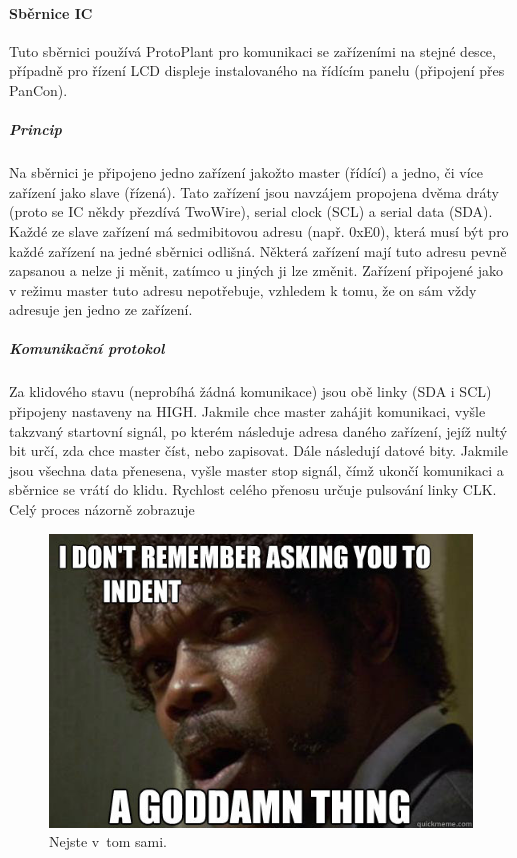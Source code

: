 \paragraph{Sběrnice IC}
Tuto sběrnici používá ProtoPlant pro komunikaci se zařízeními na stejné desce, případně pro řízení LCD displeje instalovaného na řídícím panelu (připojení přes PanCon). 

\subparagraph{Princip}
Na sběrnici je připojeno jedno zařízení jakožto master (řídící) a jedno, či více zařízení jako slave (řízená).
Tato zařízení jsou navzájem propojena dvěma dráty (proto se IC někdy přezdívá TwoWire), serial clock (SCL) a serial data (SDA).
Každé ze slave zařízení má sedmibitovou adresu (např. 0xE0), která musí být pro každé zařízení na jedné sběrnici odlišná.
Některá zařízení mají tuto adresu pevně zapsanou a nelze ji měnit, zatímco u jiných ji lze změnit.
Zařízení připojené jako v režimu master tuto adresu nepotřebuje, vzhledem k tomu, že on sám vždy adresuje jen jedno ze zařízení.

\subparagraph{Komunikační protokol}
Za klidového stavu (neprobíhá žádná komunikace) jsou obě linky (SDA i SCL) připojeny nastaveny na HIGH.
Jakmile chce master zahájit komunikaci, vyšle takzvaný startovní signál, po kterém následuje adresa daného zařízení, jejíž nultý bit určí, zda chce master číst, nebo zapisovat.
Dále následují datové bity.
Jakmile jsou všechna data přenesena, vyšle master stop signál, čímž ukončí komunikaci a sběrnice se vrátí do klidu.
Rychlost celého přenosu určuje pulsování linky CLK.
Celý proces názorně zobrazuje 

\begin{figure}[h]
   \centering
   \includegraphics[width=\textwidth]{img/pulp.jpg}
   \caption{Nejste v~tom sami.}
   \label{fig:I2C-protocol}
\end{figure}

